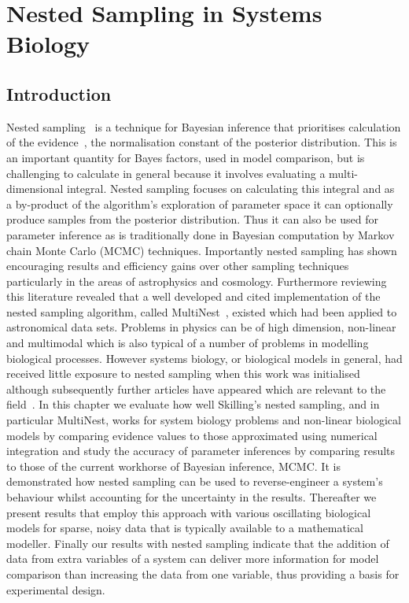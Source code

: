 \chapter{Nested Sampling in Systems Biology}
\label{chapter:nestedSampling}

\section{Introduction}
Nested sampling~\cite{Skilling2006, sivia2006} is a technique for Bayesian inference that prioritises calculation of the evidence~\cite{mackay2003}, the normalisation constant of the posterior distribution.
This is an important quantity for Bayes factors, used in model comparison, but is challenging to calculate in general because it involves evaluating a multi-dimensional integral.
Nested sampling focuses on calculating this integral and as a by-product of the algorithm's exploration of parameter space it can optionally produce samples from the posterior distribution.
Thus it can also be used for parameter inference as is traditionally done in Bayesian computation by Markov chain Monte Carlo (MCMC) techniques.
Importantly nested sampling has shown encouraging results and efficiency gains over other sampling techniques~\cite{mukherjee2006, murray2007, feroz2008} particularly in the areas of astrophysics and cosmology.
Furthermore reviewing this literature revealed that a well developed and cited implementation of the nested sampling algorithm, called MultiNest~\cite{feroz2009multinest}, existed which had been applied to astronomical data sets.
Problems in physics can be of high dimension, non-linear and multimodal which is also typical of a number of problems in modelling biological processes.
However systems biology, or biological models in general, had received little exposure to nested sampling when this work was initialised~\cite{partay2010} although subsequently further articles have appeared which are relevant to the field~\cite{burkoff2012,aitken2013}.
In this chapter we evaluate how well Skilling's nested sampling, and in particular MultiNest, works for system biology problems and non-linear biological models by comparing evidence values to those approximated using numerical integration and study the accuracy of parameter inferences by comparing results to those of the current workhorse of Bayesian inference, MCMC.
It is demonstrated how nested sampling can be used to reverse-engineer a system's behaviour whilst accounting for the uncertainty in the results.
Thereafter we present results that employ this approach with various oscillating biological models for sparse, noisy data that is typically available to a mathematical modeller.
Finally our results with nested sampling indicate that the addition of data from extra variables of a system can deliver more information for model comparison than increasing the data from one variable, thus providing a basis for experimental design.

